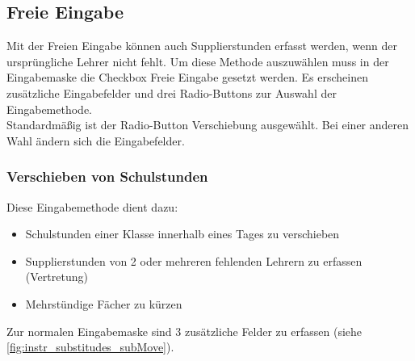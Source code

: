 \subsection{Freie Eingabe} \label{sec:instr_admin_sub_Free}
Mit der Freien Eingabe können auch Supplierstunden erfasst werden, wenn der ursprüngliche Lehrer nicht fehlt. Um diese Methode auszuwählen muss in der Eingabemaske die Checkbox Freie Eingabe gesetzt werden. Es erscheinen zusätzliche Eingabefelder und drei Radio-Buttons zur Auswahl der Eingabemethode.\\
Standardmäßig ist der Radio-Button Verschiebung ausgewählt. Bei einer anderen Wahl ändern sich die Eingabefelder.
\subsubsection{Verschieben von Schulstunden} \label{sec:instr_admin_sub_move}
Diese Eingabemethode dient dazu:
\begin{itemize}
	\item Schulstunden einer Klasse innerhalb eines Tages zu verschieben
	\item Supplierstunden von 2 oder mehreren fehlenden Lehrern zu erfassen (Vertretung)
	\item Mehrstündige Fächer zu kürzen
\end{itemize}
Zur normalen Eingabemaske sind 3 zusätzliche Felder zu erfassen (siehe \autoref{fig:instr_substitudes_subMove}).
